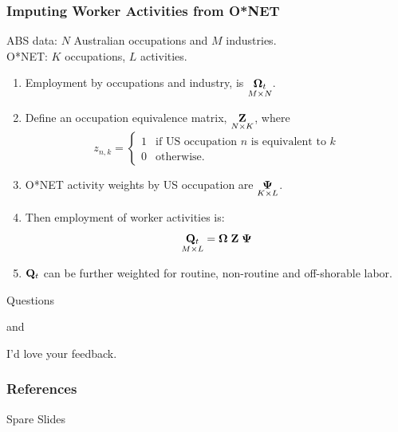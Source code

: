 \documentclass[red]{beamer}
\begin{document}
\begin{frame}
  \frametitle{Imputing Worker Activities from O*NET}
ABS data: $N$ Australian occupations and $M$ industries.\\
O*NET: $K$ occupations, $L$ activities.
  \begin{enumerate}
  \item Employment by occupations and industry, is 
    $\underset{M\times N}{{\bf \Omega}_t}$.
  \item Define an occupation equivalence matrix, $\underset{N\times K}{\bf Z}$, where \vspace{-10pt}   \[
    z_{n,k} = \left\{ 
      \begin{array}{ll}1 &\text{if US occupation $n$ is equivalent to $k$}\\
      0 & \text{otherwise.}\end{array}\right.
    \]
  \item O*NET activity weights by US occupation are $\underset{K\times L}{\bf \Psi}$.
  \item Then employment of worker activities is:
    $$ \underset{M\times L}{{\bf Q}_t} = {\bf \Omega\; Z\; \Psi} $$
  \item ${{\bf Q}_t}$ can be further weighted for routine, non-routine and off-shorable labor.
  \end{enumerate}
\end{frame}

\begin{frame}
  \begin{center}
    Questions
    \vspace{1cm}

    and
    \vspace{1cm}

    I'd love your feedback.
  \end{center}
\end{frame}

\begin{frame}
\frametitle{References}
\printbibliography
\end{frame}

\begin{frame}
  \begin{center}
    Spare Slides
  \end{center}
\end{frame}
\end{document}
